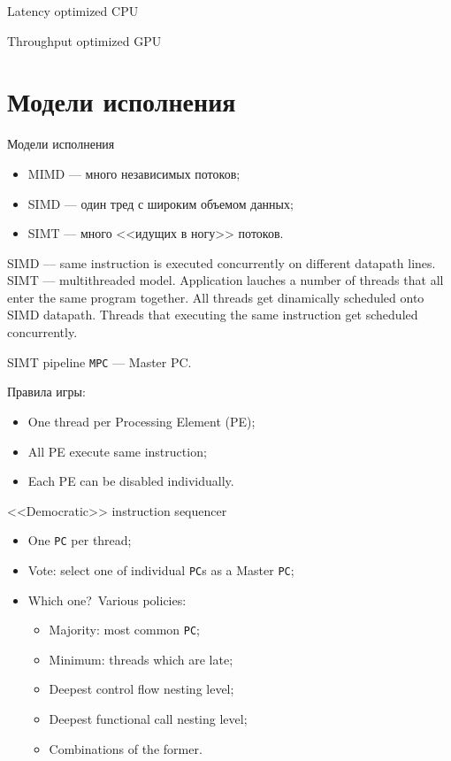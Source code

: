 \begin{frame}
Latency optimized CPU

Throughput optimized GPU
\end{frame}

\section{Модели исполнения}

\begin{frame}{Модели исполнения}
\begin{itemize}
    \item MIMD --- много независимых потоков;
    \item SIMD --- один тред с широким объемом данных;
    \item SIMT --- много <<идущих в ногу>> потоков.
\end{itemize}
\vfill
SIMD --- same instruction is executed concurrently on different datapath lines.
\vfill
SIMT --- multithreaded model. Application lauches a number of threads that all
enter the same program together. All threads get dinamically scheduled onto
SIMD datapath. Threads that executing the same instruction get scheduled
concurrently.
\end{frame}

\begin{frame}{SIMT pipeline}
\centering
{}
\vfill
\texttt{MPC} --- Master PC.
\end{frame}

\begin{frame}
Правила игры:
\begin{itemize}
    \item One thread per Processing Element (PE);
    \item All PE execute same instruction;
    \item Each PE can be disabled individually.
\end{itemize}
\end{frame}

\begin{frame}{<<Democratic>> instruction sequencer}
\begin{itemize}
    \item One \texttt{PC} per thread;\pause
    \item Vote: select one of individual \texttt{PC}s as a Master \texttt{PC};\pause
    \item Which one?\pause~Various policies:
    \begin{itemize}
        \item Majority: most common \texttt{PC};
        \item Minimum: threads which are late;
        \item Deepest control flow  nesting level;
        \item Deepest functional call nesting level;
        \item Combinations of the former.
    \end{itemize}
\end{itemize}
\end{frame}


